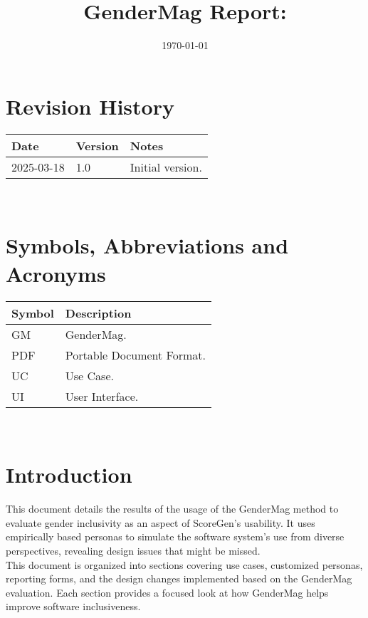 \documentclass[12pt, titlepage]{article}
\begin{document}
\title{GenderMag Report: \progname} 
\author{\authname}
\date{\today}
	
\maketitle


\section{Revision History}

\begin{tabularx}{\textwidth}{p{3cm}p{2cm}X}
\toprule {\bf Date} & {\bf Version} & {\bf Notes}\\
\midrule
2025-03-18 & 1.0 & Initial version.\\
\bottomrule
\end{tabularx}

~\newpage

\section{Symbols, Abbreviations and Acronyms}

\renewcommand{\arraystretch}{1.2}
\begin{table}[h!]
  \vspace{5pt}
  \begin{tabular}{l l} 
    \toprule		
    \textbf{Symbol} & \textbf{Description} \\
    \midrule 
    GM & GenderMag. \\
    PDF & Portable Document Format. \\
    UC & Use Case. \\
    UI & User Interface. \\
    \bottomrule
  \end{tabular}\\
\end{table}
\newpage

\tableofcontents

\newpage

\newpage

\section{Introduction} %
This document details the results of the usage of the GenderMag method to evaluate gender
inclusivity as an aspect of ScoreGen's usability. It uses empirically based personas to simulate
the software system's use from diverse perspectives, revealing design issues that might be missed.\\
This document is organized into sections covering use cases, customized personas, reporting forms, 
and the design changes implemented based on the GenderMag evaluation. Each section provides a focused 
look at how GenderMag helps improve software inclusiveness.
\end{document}
